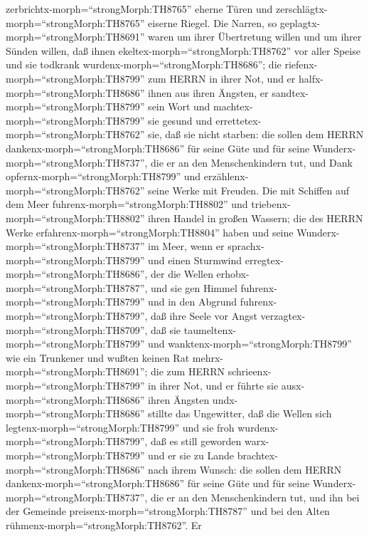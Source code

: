 zerbrichtx-morph=``strongMorph:TH8765'' eherne Türen und
zerschlägtx-morph=``strongMorph:TH8765'' eiserne Riegel. 
Die Narren, so geplagtx-morph=``strongMorph:TH8691'' waren um ihrer
Übertretung willen und um ihrer Sünden willen,  daß ihnen
ekeltex-morph=``strongMorph:TH8762'' vor aller Speise und sie todkrank
wurdenx-morph=``strongMorph:TH8686'';  die
riefenx-morph=``strongMorph:TH8799'' zum HERRN in ihrer Not, und er
halfx-morph=``strongMorph:TH8686'' ihnen aus ihren Ängsten,
 er sandtex-morph=``strongMorph:TH8799'' sein Wort und
machtex-morph=``strongMorph:TH8799'' sie gesund und
errettetex-morph=``strongMorph:TH8762'' sie, daß sie nicht starben:
 die sollen dem HERRN dankenx-morph=``strongMorph:TH8686''
für seine Güte und für seine Wunderx-morph=``strongMorph:TH8737'', die
er an den Menschenkindern tut,  und Dank
opfernx-morph=``strongMorph:TH8799'' und
erzählenx-morph=``strongMorph:TH8762'' seine Werke mit Freuden.
 Die mit Schiffen auf dem Meer
fuhrenx-morph=``strongMorph:TH8802'' und
triebenx-morph=``strongMorph:TH8802'' ihren Handel in großen Wassern;
 die des HERRN Werke erfahrenx-morph=``strongMorph:TH8804''
haben und seine Wunderx-morph=``strongMorph:TH8737'' im Meer,
 wenn er sprachx-morph=``strongMorph:TH8799'' und einen
Sturmwind erregtex-morph=``strongMorph:TH8686'', der die Wellen
erhobx-morph=``strongMorph:TH8787'',  und sie gen Himmel
fuhrenx-morph=``strongMorph:TH8799'' und in den Abgrund
fuhrenx-morph=``strongMorph:TH8799'', daß ihre Seele vor Angst
verzagtex-morph=``strongMorph:TH8709'',  daß sie
taumeltenx-morph=``strongMorph:TH8799'' und
wanktenx-morph=``strongMorph:TH8799'' wie ein Trunkener und wußten
keinen Rat mehrx-morph=``strongMorph:TH8691'';  die zum
HERRN schrieenx-morph=``strongMorph:TH8799'' in ihrer Not, und er führte
sie ausx-morph=``strongMorph:TH8686'' ihren Ängsten 
undx-morph=``strongMorph:TH8686'' stillte das Ungewitter, daß die Wellen
sich legtenx-morph=``strongMorph:TH8799''  und sie froh
wurdenx-morph=``strongMorph:TH8799'', daß es still geworden
warx-morph=``strongMorph:TH8799'' und er sie zu Lande
brachtex-morph=``strongMorph:TH8686'' nach ihrem Wunsch: 
die sollen dem HERRN dankenx-morph=``strongMorph:TH8686'' für seine Güte
und für seine Wunderx-morph=``strongMorph:TH8737'', die er an den
Menschenkindern tut,  und ihn bei der Gemeinde
preisenx-morph=``strongMorph:TH8787'' und bei den Alten
rühmenx-morph=``strongMorph:TH8762''.  Er
